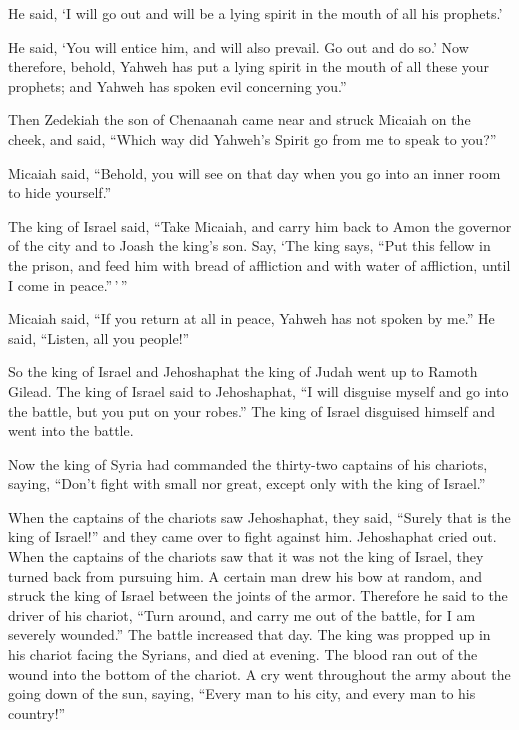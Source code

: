 He said, `I will go out and will be a lying spirit in the mouth of all
his prophets.'

He said, `You will entice him, and will also prevail. Go out and do so.'
 Now therefore, behold, Yahweh has put a lying spirit in
the mouth of all these your prophets; and Yahweh has spoken evil
concerning you.''

 Then Zedekiah the son of Chenaanah came near and struck
Micaiah on the cheek, and said, ``Which way did Yahweh's Spirit go from
me to speak to you?''

 Micaiah said, ``Behold, you will see on that day when
you go into an inner room to hide yourself.''

 The king of Israel said, ``Take Micaiah, and carry him
back to Amon the governor of the city and to Joash the king's son.
 Say, `The king says, ``Put this fellow in the prison,
and feed him with bread of affliction and with water of affliction,
until I come in peace.''\,'\,''

 Micaiah said, ``If you return at all in peace, Yahweh
has not spoken by me.'' He said, ``Listen, all you people!''

 So the king of Israel and Jehoshaphat the king of Judah
went up to Ramoth Gilead.  The king of Israel said to
Jehoshaphat, ``I will disguise myself and go into the battle, but you
put on your robes.'' The king of Israel disguised himself and went into
the battle.

 Now the king of Syria had commanded the thirty-two
captains of his chariots, saying, ``Don't fight with small nor great,
except only with the king of Israel.''

 When the captains of the chariots saw Jehoshaphat, they
said, ``Surely that is the king of Israel!'' and they came over to fight
against him. Jehoshaphat cried out.  When the captains of
the chariots saw that it was not the king of Israel, they turned back
from pursuing him.  A certain man drew his bow at random,
and struck the king of Israel between the joints of the armor. Therefore
he said to the driver of his chariot, ``Turn around, and carry me out of
the battle, for I am severely wounded.''  The battle
increased that day. The king was propped up in his chariot facing the
Syrians, and died at evening. The blood ran out of the wound into the
bottom of the chariot.  A cry went throughout the army
about the going down of the sun, saying, ``Every man to his city, and
every man to his country!''

